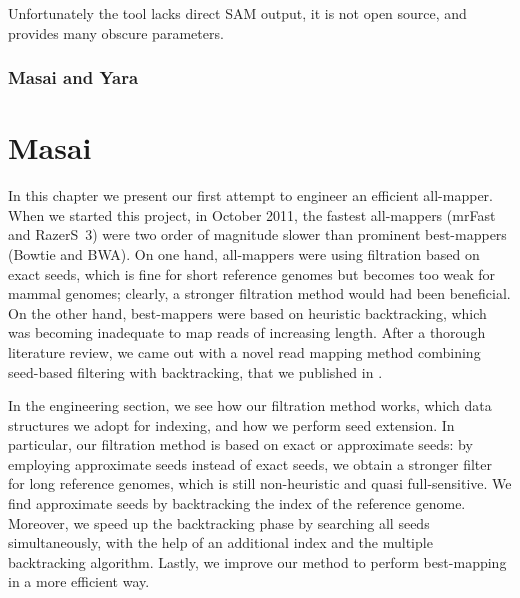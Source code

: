 Unfortunately the tool lacks direct SAM output, it is not open source, and provides many obscure parameters.


\subsection{Masai and Yara}


\begin{landscape}
\begin{table}[h]
  \center
  \sffamily
	\renewcommand{\tabcolsep}{0.8ex}
	
\end{table}
\end{landscape}


\chapter{Masai}

In this chapter we present our first attempt to engineer an efficient all-mapper.
When we started this project, in October 2011, the fastest all-mappers (mrFast and RazerS~3) were two order of magnitude slower than prominent best-mappers (Bowtie and BWA).
On one hand, all-mappers were using filtration based on exact seeds, which is fine for short reference genomes but becomes too weak for mammal genomes; clearly, a stronger filtration method would had been beneficial.
On the other hand, best-mappers were based on heuristic backtracking, which was becoming inadequate to map reads of increasing length.
After a thorough literature review, we came out with a novel read mapping method combining seed-based filtering with backtracking, that we published in \citep{Siragusa2013}.

In the engineering section, we see how our filtration method works, which data structures we adopt for indexing, and how we perform seed extension.
In particular, our filtration method is based on exact or approximate seeds: by employing approximate seeds instead of exact seeds, we obtain a stronger filter for long reference genomes, which is still non-heuristic and quasi full-sensitive.
We find approximate seeds by backtracking the index of the reference genome.
Moreover, we speed up the backtracking phase by searching all seeds simultaneously, with the help of an additional index and the multiple backtracking algorithm.
Lastly, we improve our method to perform best-mapping in a more efficient way.


